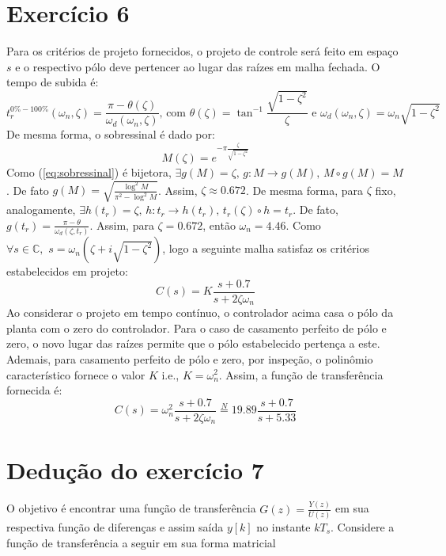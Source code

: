 \documentclass{article}
\begin{document}
\section*{Exercício 6}
Para os critérios de projeto fornecidos, o projeto de controle será feito em espaço $s$ e o respectivo pólo deve pertencer ao lugar das raízes em malha fechada. O tempo de subida é:
\begin{equation}
\label{eq:sobressinal}
t^{0\% - 100\%}_{r}(\omega_n, \zeta) = \frac{\pi - \theta(\zeta)}{\omega_d(\omega_n, \zeta)} \mbox{, com } \theta(\zeta) = \tan^{-1}\frac{\sqrt{1 - \zeta^2}}{\zeta} \mbox{ e } \omega_d(\omega_n, \zeta) = \omega_n \sqrt{1-\zeta^2}
\end{equation}
De mesma forma, o sobressinal é dado por:
\begin{equation}
\label{eq:sobressinal}
M(\zeta) = e^{-\pi \frac{\zeta}{\sqrt{1-\zeta^2}}}
\end{equation}
Como (\ref{eq:sobressinal}) é bijetora, $\exists g(M) = \zeta \mbox{, } g: M \rightarrow g(M) \mbox{, } M \circ g (M) = M$. De fato $g(M) = \sqrt{\frac{\log^2{M}}{\pi^2 - \log^2{M}}}$. Assim, $\zeta \approx 0.672$. De mesma forma, para $\zeta$ fixo, analogamente, $\exists h(t_r) = \zeta\mbox{, }h: t_r \rightarrow h(t_r)\mbox{, } t_r(\zeta) \circ h = t_r$. De fato, $g(t_r) = \frac{\pi - \theta}{\omega_d(\zeta, t_r)}$. Assim, para $\zeta = 0.672$, então $\omega_n = 4.46$.
Como $\forall s \in \mathbb{C}, \,\, s = \omega_n (\zeta + i \sqrt{1 - \zeta^2})$, logo a seguinte malha satisfaz os critérios estabelecidos em projeto:
\begin{equation}
C(s) = K \frac{s + 0.7}{s + 2 \zeta \omega_n}
\end{equation}
Ao considerar o projeto em tempo contínuo, o controlador acima casa o pólo da planta com o zero do controlador. Para o caso de casamento perfeito de pólo e zero, o novo lugar das raízes permite que o pólo estabelecido pertença a este. Ademais, para casamento perfeito de pólo e zero, por inspeção, o polinômio característico fornece o valor $K$ i.e., $K = \omega_n^2$. Assim, a função de transferência fornecida é:
\begin{equation}
C(s) = \omega_n^2 \frac{s + 0.7}{s + 2 \zeta \omega_n} \stackrel{N}{=} 19.89 \frac{s + 0.7}{s + 5.33}
\end{equation}

\section*{Dedução do exercício 7}
\label{sec:deducao7}
O objetivo é encontrar uma função de transferência $G(z) = \frac{Y(z)}{U(z)}$ em sua respectiva função de diferenças e assim saída $y[k]$ no instante $k T_s$. Considere a função de transferência a seguir em sua forma matricial
\end{document}
